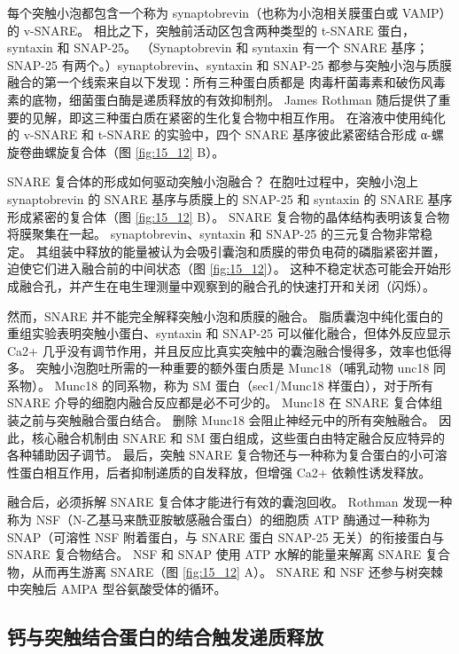 每个突触小泡都包含一个称为 synaptobrevin（也称为小泡相关膜蛋白或 VAMP）的 v-SNARE。 
相比之下，突触前活动区包含两种类型的 t-SNARE 蛋白，syntaxin 和 SNAP-25。 
（Synaptobrevin 和 syntaxin 有一个 SNARE 基序；SNAP-25 有两个。）synaptobrevin、syntaxin 和 SNAP-25 都参与突触小泡与质膜融合的第一个线索来自以下发现：所有三种蛋白质都是 肉毒杆菌毒素和破伤风毒素的底物，细菌蛋白酶是递质释放的有效抑制剂。 
James Rothman 随后提供了重要的见解，即这三种蛋白质在紧密的生化复合物中相互作用。 
在溶液中使用纯化的 v-SNARE 和 t-SNARE 的实验中，四个 SNARE 基序彼此紧密结合形成 α-螺旋卷曲螺旋复合体（图 \ref{fig:15_12} B）。


SNARE 复合体的形成如何驱动突触小泡融合？ 
在胞吐过程中，突触小泡上 synaptobrevin 的 SNARE 基序与质膜上的 SNAP-25 和 syntaxin 的 SNARE 基序形成紧密的复合体（图 \ref{fig:15_12} B）。 
SNARE 复合物的晶体结构表明该复合物将膜聚集在一起。 synaptobrevin、syntaxin 和 SNAP-25 的三元复合物非常稳定。 
其组装中释放的能量被认为会吸引囊泡和质膜的带负电荷的磷脂紧密并置，迫使它们进入融合前的中间状态（图 \ref{fig:15_12}）。 
这种不稳定状态可能会开始形成融合孔，并产生在电生理测量中观察到的融合孔的快速打开和关闭（闪烁）。


然而，SNARE 并不能完全解释突触小泡和质膜的融合。 脂质囊泡中纯化蛋白的重组实验表明突触小蛋白、syntaxin 和 SNAP-25 可以催化融合，但体外反应显示 Ca2+ 几乎没有调节作用，并且反应比真实突触中的囊泡融合慢得多，效率也低得多。 
突触小泡胞吐所需的一种重要的额外蛋白质是 Munc18（哺乳动物 unc18 同系物）。 
Munc18 的同系物，称为 SM 蛋白（sec1/Munc18 样蛋白），对于所有 SNARE 介导的细胞内融合反应都是必不可少的。 
Munc18 在 SNARE 复合体组装之前与突触融合蛋白结合。 
删除 Munc18 会阻止神经元中的所有突触融合。 
因此，核心融合机制由 SNARE 和 SM 蛋白组成，这些蛋白由特定融合反应特异的各种辅助因子调节。 
最后，突触 SNARE 复合物还与一种称为复合蛋白的小可溶性蛋白相互作用，后者抑制递质的自发释放，但增强 Ca2+ 依赖性诱发释放。


融合后，必须拆解 SNARE 复合体才能进行有效的囊泡回收。 
Rothman 发现一种称为 NSF（N-乙基马来酰亚胺敏感融合蛋白）的细胞质 ATP 酶通过一种称为 SNAP（可溶性 NSF 附着蛋白，与 SNARE 蛋白 SNAP-25 无关）的衔接蛋白与 SNARE 复合物结合。 
NSF 和 SNAP 使用 ATP 水解的能量来解离 SNARE 复合物，从而再生游离 SNARE（图 \ref{fig:15_12} A）。 
SNARE 和 NSF 还参与树突棘中突触后 AMPA 型谷氨酸受体的循环。


\subsection{钙与突触结合蛋白的结合触发递质释放}

